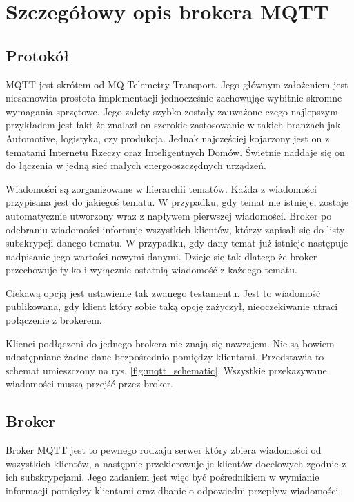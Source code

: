\chapter{Szczegółowy opis brokera MQTT}
    \section{Protokół}
        MQTT jest skrótem od MQ Telemetry Transport. Jego głównym założeniem jest niesamowita prostota implementacji jednocześnie zachowując wybitnie skromne wymagania sprzętowe. Jego zalety szybko zostały zauważone czego najlepszym przykładem jest fakt że znalazł on szerokie zastosowanie w takich branżach jak Automotive, logistyka, czy produkcja. Jednak najczęściej kojarzony jest on z tematami Internetu Rzeczy oraz Inteligentnych Domów. Świetnie naddaje się on do łączenia w jedną sieć małych energooszczędnych urządzeń. 
        
        Wiadomości są zorganizowane w hierarchii tematów. Każda z wiadomości przypisana jest do jakiegoś tematu. W przypadku, gdy temat nie istnieje, zostaje automatycznie utworzony wraz z napływem pierwszej wiadomości. Broker po odebraniu wiadomości informuje wszystkich klientów, którzy zapisali się do listy subskrypcji danego tematu. W przypadku, gdy dany temat już istnieje następuje nadpisanie jego wartości nowymi danymi. Dzieje się tak dlatego że broker przechowuje tylko i wyłącznie ostatnią wiadomość z każdego tematu.
        
        Ciekawą opcją jest ustawienie tak zwanego testamentu. Jest to wiadomość publikowana, gdy klient który sobie taką opcję zażyczył, nieoczekiwanie utraci połączenie z brokerem.
        
        Klienci podłączeni do jednego brokera nie znają się nawzajem. Nie są bowiem udostępniane żadne dane bezpośrednio pomiędzy klientami. Przedstawia to schemat umieszczony na rys. \ref{fig:mqtt_schematic}.
        Wszystkie przekazywane wiadomości muszą przejść przez broker. 
        
    \section{Broker}
        Broker MQTT jest to pewnego rodzaju serwer który zbiera wiadomości od wszystkich klientów, a następnie przekierowuje je klientów docelowych zgodnie z ich subskrypcjami. Jego zadaniem jest więc być pośrednikiem w wymianie informacji pomiędzy klientami oraz dbanie o odpowiedni przepływ wiadomości. 
                    
